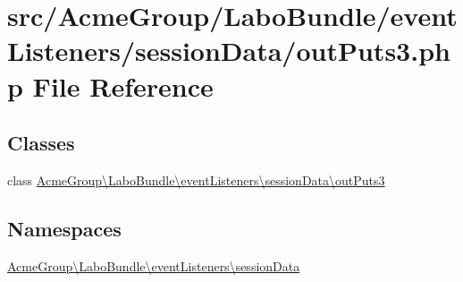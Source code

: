 \hypertarget{_labo_bundle_2event_listeners_2session_data_2out_puts3_8php}{\section{src/\+Acme\+Group/\+Labo\+Bundle/event\+Listeners/session\+Data/out\+Puts3.php File Reference}
\label{_labo_bundle_2event_listeners_2session_data_2out_puts3_8php}
}
\subsection*{Classes}
\begin{DoxyCompactItemize}
\item 
class \hyperlink{class_acme_group_1_1_labo_bundle_1_1event_listeners_1_1session_data_1_1out_puts3}{Acme\+Group\textbackslash{}\+Labo\+Bundle\textbackslash{}event\+Listeners\textbackslash{}session\+Data\textbackslash{}out\+Puts3}
\end{DoxyCompactItemize}
\subsection*{Namespaces}
\begin{DoxyCompactItemize}
\item 
 \hyperlink{namespace_acme_group_1_1_labo_bundle_1_1event_listeners_1_1session_data}{Acme\+Group\textbackslash{}\+Labo\+Bundle\textbackslash{}event\+Listeners\textbackslash{}session\+Data}
\end{DoxyCompactItemize}
